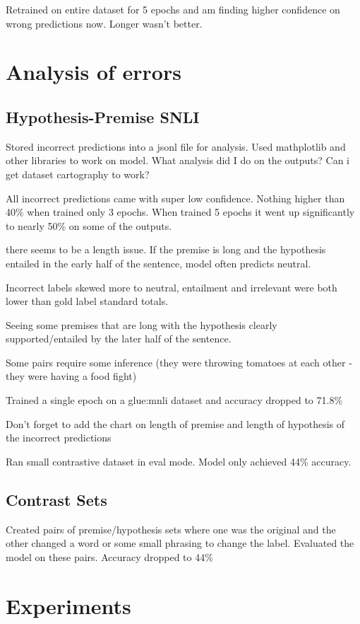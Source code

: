 \documentclass{article}
\begin{document}
\begin{multicols*}{2}
Retrained on entire dataset for 5 epochs and am finding higher confidence on wrong predictions now. Longer wasn't better.

\section{Analysis of errors}
\subsection{Hypothesis-Premise SNLI}
Stored incorrect predictions into a jsonl file for analysis. Used mathplotlib and other libraries to work on model.
What analysis did I do on the outputs? Can i get dataset cartography to work?

All incorrect predictions came with super low confidence. Nothing higher than 40\% when trained only 3 epochs. When trained 5 epochs it went up significantly to nearly 50\% on some of the outputs.

there seems to be a length issue. If the premise is long and the hypothesis entailed in the early half of the sentence, model often predicts neutral.

Incorrect labels skewed more to neutral, entailment and irrelevant were both lower than gold label standard totals.

Seeing some premises that are long with the hypothesis clearly supported/entailed by the later half of the sentence. 

Some pairs require some inference (they were throwing tomatoes at each other - they were having a food fight)

Trained a single epoch on a glue:mnli dataset and accuracy dropped to 71.8\%

Don't forget to add the chart on length of premise and length of hypothesis of the incorrect predictions

Ran small contrastive dataset in eval mode. Model only achieved 44\% accuracy.
\subsection{Contrast Sets}
Created pairs of premise/hypothesis sets where one was the original and the other changed a word or some small phrasing to change the label. Evaluated the model on these pairs. Accuracy dropped to 44\% 

\section{Experiments}

\end{multicols*}
\end{document}
